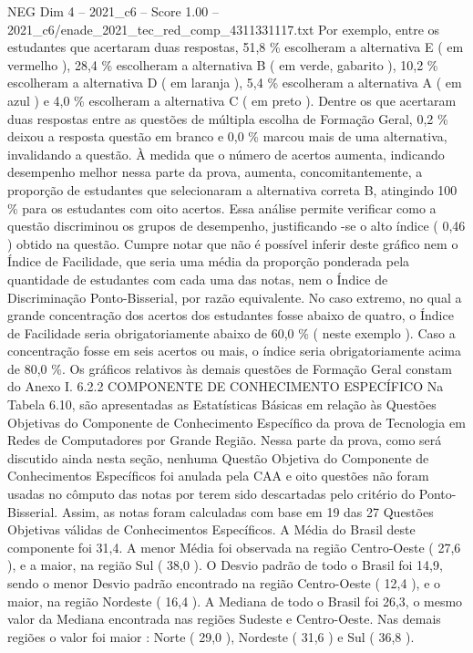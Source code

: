 \begin{textsample}{NEG Dim 4 – 2021\_c6 – Score 1.00 – 2021\_c6/enade\_2021\_tec\_red\_comp\_4311331117.txt}
Por exemplo, entre os estudantes que acertaram duas respostas, 51,8 \% escolheram a alternativa E ( em vermelho ), 28,4 \% escolheram a alternativa B ( em verde, gabarito ), 10,2 \% escolheram a alternativa D ( em laranja ), 5,4 \% escolheram a alternativa A ( em azul ) e 4,0 \% escolheram a alternativa C ( em preto ).
Dentre os que acertaram duas respostas entre as questões de múltipla escolha de Formação Geral, 0,2 \% deixou a resposta questão em branco e 0,0 \% marcou mais de uma alternativa, invalidando a questão.
À medida que o número de acertos aumenta, indicando desempenho melhor nessa parte da prova, aumenta, concomitantemente, a proporção de estudantes que selecionaram a alternativa correta B, atingindo 100 \% para os estudantes com oito acertos.
Essa análise permite verificar como a questão discriminou os grupos de desempenho, justificando -se o alto índice ( 0,46 ) obtido na questão.
Cumpre notar que não é possível inferir deste gráfico nem o Índice de Facilidade, que seria uma média da proporção ponderada pela quantidade de estudantes com cada uma das notas, nem o Índice de Discriminação Ponto-Bisserial, por razão equivalente.
No caso extremo, no qual a grande concentração dos acertos dos estudantes fosse abaixo de quatro, o Índice de Facilidade seria obrigatoriamente abaixo de 60,0 \% ( neste exemplo ).
Caso a concentração fosse em seis acertos ou mais, o índice seria obrigatoriamente acima de 80,0 \%.
Os gráficos relativos às demais questões de Formação Geral constam do Anexo I. 6.2.2 COMPONENTE DE CONHECIMENTO ESPECÍFICO Na Tabela 6.10, são apresentadas as Estatísticas Básicas em relação às Questões Objetivas do Componente de Conhecimento Específico da prova de Tecnologia em Redes de Computadores por Grande Região.
Nessa parte da prova, como será discutido ainda nesta seção, nenhuma Questão Objetiva do Componente de Conhecimentos Específicos foi anulada pela CAA e oito questões não foram usadas no cômputo das notas por terem sido descartadas pelo critério do Ponto-Bisserial.
Assim, as notas foram calculadas com base em 19 das 27 Questões Objetivas válidas de Conhecimentos Específicos.
A Média do Brasil deste componente foi 31,4.
A menor Média foi observada na região Centro-Oeste ( 27,6 ), e a maior, na região Sul ( 38,0 ).
O Desvio padrão de todo o Brasil foi 14,9, sendo o menor Desvio padrão encontrado na região Centro-Oeste ( 12,4 ), e o maior, na região Nordeste ( 16,4 ).
A Mediana de todo o Brasil foi 26,3, o mesmo valor da Mediana encontrada nas regiões Sudeste e Centro-Oeste.
Nas demais regiões o valor foi maior : Norte ( 29,0 ), Nordeste ( 31,6 ) e Sul ( 36,8 ).

\end{textsample}
